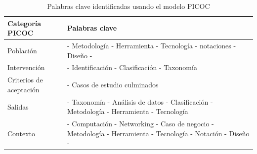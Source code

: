 \begin{table}[H]
	\centering
	\renewcommand{\arraystretch}{1.4}
	\fontsize{8}{8}\selectfont
	\begin{tabular}{|p{3cm}|p{10.0cm}|}
		\hline
		\textbf{Categoría \hbox{PICOC}} & \textbf{Palabras clave} \\
		\hline
		Población                       &
		- Metodología \newline
		- Herramienta \newline
		- Tecnología \newline
		- notaciones \newline
		- Diseño \newline
		- \TI 													   \\
		\hline
		Intervención                    &
		- Identificación  \newline
		- Clasificación  \newline
		- Taxonomía                                               \\
		\hline
		Criterios de aceptación         &
		- Casos de estudio culminados                             \\
		\hline
		Salidas                         &
		- Taxonomía \newline
		- Análisis de datos \newline
		- Clasificación \newline
		- Metodología \newline
		- Herramienta \newline
		- Tecnología                                               \\
		\hline
		Contexto                        &
		- Computación  \newline
		- Networking  \newline
		- Caso de negocio \newline
		- Metodología  \newline
		- Herramienta  \newline
		- Tecnología  \newline
		- Notación \newline
		- Diseño \newline
		- \TI                                               \\
		\hline
	\end{tabular}
	\caption{Palabras clave identificadas usando el modelo PICOC}
	\label{table:keywords-picoc}
\end{table}

